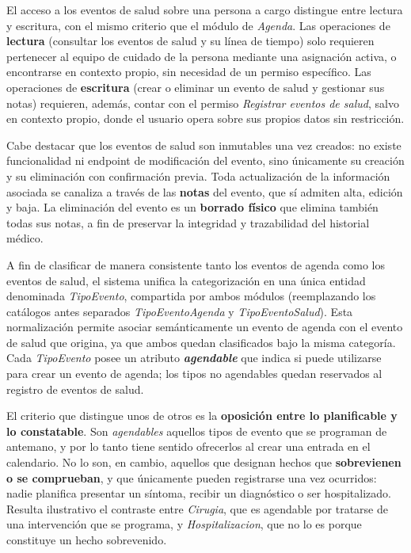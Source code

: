 \documentclass[a4paper,12pt]{article}
\begin{document}
    \par El acceso a los eventos de salud sobre una persona a cargo distingue entre lectura y escritura, con el mismo criterio que el módulo de \textit{Agenda}. Las operaciones de \textbf{lectura} (consultar los eventos de salud y su línea de tiempo) solo requieren pertenecer al equipo de cuidado de la persona mediante una asignación activa, o encontrarse en contexto propio, sin necesidad de un permiso específico. Las operaciones de \textbf{escritura} (crear o eliminar un evento de salud y gestionar sus notas) requieren, además, contar con el permiso \textit{Registrar eventos de salud}, salvo en contexto propio, donde el usuario opera sobre sus propios datos sin restricción.
    \par Cabe destacar que los eventos de salud son inmutables una vez creados: no existe funcionalidad ni endpoint de modificación del evento, sino únicamente su creación y su eliminación con confirmación previa. Toda actualización de la información asociada se canaliza a través de las \textbf{notas} del evento, que sí admiten alta, edición y baja. La eliminación del evento es un \textbf{borrado físico} que elimina también todas sus notas, a fin de preservar la integridad y trazabilidad del historial médico.
    \par A fin de clasificar de manera consistente tanto los eventos de agenda como los eventos de salud, el sistema unifica la categorización en una única entidad denominada \textit{TipoEvento}, compartida por ambos módulos (reemplazando los catálogos antes separados \textit{TipoEventoAgenda} y \textit{TipoEventoSalud}). Esta normalización permite asociar semánticamente un evento de agenda con el evento de salud que origina, ya que ambos quedan clasificados bajo la misma categoría. Cada \textit{TipoEvento} posee un atributo \textbf{\textit{agendable}} que indica si puede utilizarse para crear un evento de agenda; los tipos no agendables quedan reservados al registro de eventos de salud.
    \par El criterio que distingue unos de otros es la \textbf{oposición entre lo planificable y lo constatable}. Son \textit{agendables} aquellos tipos de evento que se programan de antemano, y por lo tanto tiene sentido ofrecerlos al crear una entrada en el calendario. No lo son, en cambio, aquellos que designan hechos que \textbf{sobrevienen o se comprueban}, y que únicamente pueden registrarse una vez ocurridos: nadie planifica presentar un síntoma, recibir un diagnóstico o ser hospitalizado. Resulta ilustrativo el contraste entre \textit{Cirugia}, que es agendable por tratarse de una intervención que se programa, y \textit{Hospitalizacion}, que no lo es porque constituye un hecho sobrevenido.
\end{document}
